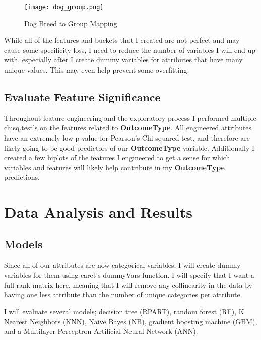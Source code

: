 \documentclass[12pt]{article} %
\begin{document}
\begin{figure}[h!]
  \centering
  \texttt{[image: dog\_group.png]}                  
  \caption{Dog Breed to Group Mapping}
  \label{fig:OutcomeType}
\end{figure}

While all of the features and buckets that I created are not perfect and may cause some specificity loss, I need to reduce the number of variables I will end up with, especially after I create dummy variables for attributes that have many unique values. This may even help prevent some overfitting. 

\subsection{Evaluate Feature Significance}
Throughout feature engineering and the exploratory process I performed multiple chisq.test's on the features related to \textbf{OutcomeType}. All engineered attributes have an extremely low p-value for Pearson's Chi-squared test, and therefore are likely going to be good predictors of our \textbf{OutcomeType} variable. Additionally I created a few biplots of the features I engineered to get a sense for which variables and features will likely help contribute in my \textbf{OutcomeType} predictions. 



\section{Data Analysis and Results}
\subsection{Models}

Since all of our attributes are now categorical variables, I will create dummy variables for them using caret's dummyVars function. I will specify that I want a full rank matrix here, meaning that I will remove any collinearity in the data by having one less attribute than the number of unique categories per attribute. 

I will evaluate several models; decision tree (RPART), random forest (RF), K Nearest Neighbors (KNN), Naive Bayes (NB), gradient boosting machine (GBM), and a Multilayer Perceptron Artificial Neural Network (ANN). 
\end{document}
